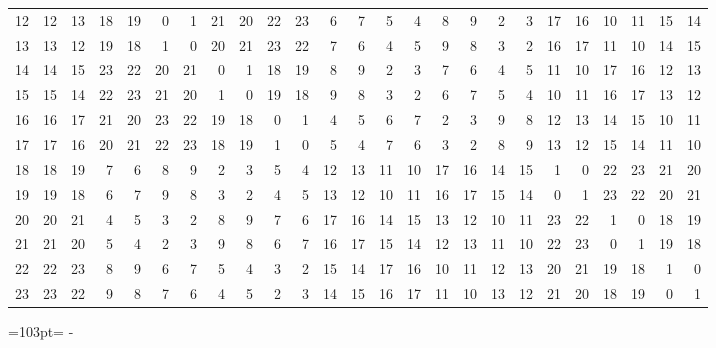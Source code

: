 \documentclass[10pt,a4paper]{article}
\newcommand{\needspace}[1]{\par\penalty-100\begingroup\dimen0=#1\relax\dimen2=\pagegoal
  \advance\dimen2-\pagetotal\ifdim\dimen0>\dimen2\relax\ifdim\dimen2>0pt\vfil\break\fi\fi
  \endgroup}
\numberwithin{equation}{section}
\begin{document}
{\begin{longtable}{@{}r|rrrrrrrrrrrrrrrrrrrrrrrr@{}}
12 & 12 & 13 & 18 & 19 & 0 & 1 & 21 & 20 & 22 & 23 & 6 & 7 & 5 & 4 & 8 & 9 & 2 & 3 & 17 & 16 & 10 & 11 & 15 & 14\\
13 & 13 & 12 & 19 & 18 & 1 & 0 & 20 & 21 & 23 & 22 & 7 & 6 & 4 & 5 & 9 & 8 & 3 & 2 & 16 & 17 & 11 & 10 & 14 & 15\\
14 & 14 & 15 & 23 & 22 & 20 & 21 & 0 & 1 & 18 & 19 & 8 & 9 & 2 & 3 & 7 & 6 & 4 & 5 & 11 & 10 & 17 & 16 & 12 & 13\\
15 & 15 & 14 & 22 & 23 & 21 & 20 & 1 & 0 & 19 & 18 & 9 & 8 & 3 & 2 & 6 & 7 & 5 & 4 & 10 & 11 & 16 & 17 & 13 & 12\\
16 & 16 & 17 & 21 & 20 & 23 & 22 & 19 & 18 & 0 & 1 & 4 & 5 & 6 & 7 & 2 & 3 & 9 & 8 & 12 & 13 & 14 & 15 & 10 & 11\\
17 & 17 & 16 & 20 & 21 & 22 & 23 & 18 & 19 & 1 & 0 & 5 & 4 & 7 & 6 & 3 & 2 & 8 & 9 & 13 & 12 & 15 & 14 & 11 & 10\\
18 & 18 & 19 & 7 & 6 & 8 & 9 & 2 & 3 & 5 & 4 & 12 & 13 & 11 & 10 & 17 & 16 & 14 & 15 & 1 & 0 & 22 & 23 & 21 & 20\\
19 & 19 & 18 & 6 & 7 & 9 & 8 & 3 & 2 & 4 & 5 & 13 & 12 & 10 & 11 & 16 & 17 & 15 & 14 & 0 & 1 & 23 & 22 & 20 & 21\\
20 & 20 & 21 & 4 & 5 & 3 & 2 & 8 & 9 & 7 & 6 & 17 & 16 & 14 & 15 & 13 & 12 & 10 & 11 & 23 & 22 & 1 & 0 & 18 & 19\\
21 & 21 & 20 & 5 & 4 & 2 & 3 & 9 & 8 & 6 & 7 & 16 & 17 & 15 & 14 & 12 & 13 & 11 & 10 & 22 & 23 & 0 & 1 & 19 & 18\\
22 & 22 & 23 & 8 & 9 & 6 & 7 & 5 & 4 & 3 & 2 & 15 & 14 & 17 & 16 & 10 & 11 & 12 & 13 & 20 & 21 & 19 & 18 & 1 & 0\\*
23 & 23 & 22 & 9 & 8 & 7 & 6 & 4 & 5 & 2 & 3 & 14 & 15 & 16 & 17 & 11 & 10 & 13 & 12 & 21 & 20 & 18 & 19 & 0 & 1\\
\bottomrule\end{longtable}}
\needspace{103pt}
\end{document}
